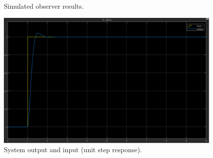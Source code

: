 \documentclass[12pt, oneside]{article}
\begin{document}
        \begin{figure}[htbp]
          \centering
          \hfill%
          \caption{Simulated observer results.}
        \end{figure}

\begin{figure}
    \centering
    \includegraphics[width = \linewidth]{Report/pics/OutputResult1.png}
    \caption{System output and input (unit step response).}
    \label{fig:OutputResult1}
\end{figure}
\FloatBarrier
\end{document}
